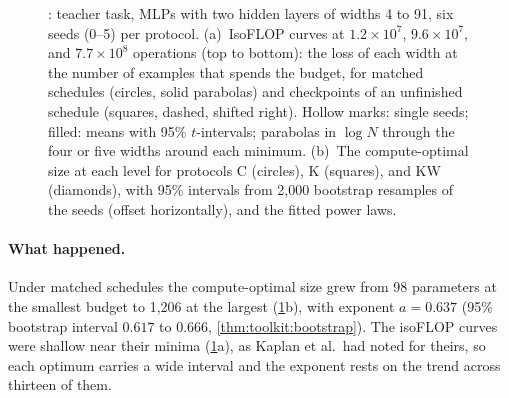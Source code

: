 \begin{refsection}
\begin{figure}[t]
\begin{fullwidth}
\caption{: teacher task, MLPs with two hidden layers of widths 4 to 91, six seeds (0--5) per protocol. (a)~IsoFLOP curves at $1.2\times10^7$, $9.6\times10^7$, and $7.7\times10^8$ operations (top to bottom): the loss of each width at the number of examples that spends the budget, for matched schedules (circles, solid parabolas) and checkpoints of an unfinished schedule (squares, dashed, shifted right). Hollow marks: single seeds; filled: means with 95\% $t$-intervals; parabolas in $\log N$ through the four or five widths around each minimum. (b)~The compute-optimal size at each level for protocols C (circles), K (squares), and KW (diamonds), with 95\% intervals from 2,000 bootstrap resamples of the seeds (offset horizontally), and the fitted power laws.}
\label{fig:protocol:schedules}
\end{fullwidth}
\end{figure}

\paragraph{What happened.} Under matched schedules the compute-optimal size grew from 98 parameters at the smallest budget to 1,206 at the largest (\cref{fig:protocol:schedules}b), with exponent $a=0.637$ (95\% bootstrap interval $0.617$ to $0.666$, \cref{thm:toolkit:bootstrap}). The isoFLOP curves were shallow near their minima (\cref{fig:protocol:schedules}a), as Kaplan et al.\ had noted for theirs, so each optimum carries a wide interval and the exponent rests on the trend across thirteen of them.


\end{refsection}
